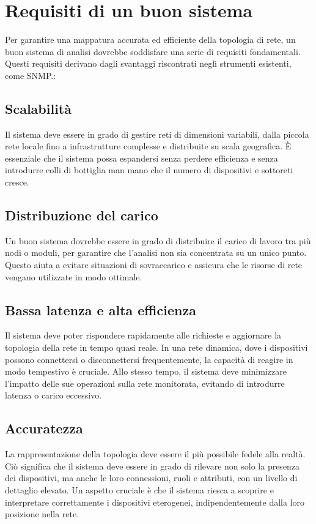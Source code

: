 \documentclass[target=bach,aauheader=,style=]{thud}
\begin{document}
\chapter{Requisiti di un buon sistema}
Per garantire una mappatura accurata ed efficiente della topologia di rete, un buon sistema di analisi dovrebbe soddisfare una serie di requisiti fondamentali. Questi requisiti derivano dagli svantaggi riscontrati negli strumenti esistenti, come SNMP.:

\section{Scalabilità}
Il sistema deve essere in grado di gestire reti di dimensioni variabili, dalla piccola rete locale fino a infrastrutture complesse e distribuite su scala geografica. È essenziale che il sistema possa espandersi senza perdere efficienza e senza introdurre colli di bottiglia man mano che il numero di dispositivi e sottoreti cresce.

\section{Distribuzione del carico}
Un buon sistema dovrebbe essere in grado di distribuire il carico di lavoro tra più nodi o moduli, per garantire che l'analisi non sia concentrata su un unico punto. Questo aiuta a evitare situazioni di sovraccarico e assicura che le risorse di rete vengano utilizzate in modo ottimale.

\section{Bassa latenza e alta efficienza}
Il sistema deve poter rispondere rapidamente alle richieste e aggiornare la topologia della rete in tempo quasi reale. In una rete dinamica, dove i dispositivi possono connettersi o disconnettersi frequentemente, la capacità di reagire in modo tempestivo è cruciale. Allo stesso tempo, il sistema deve minimizzare l'impatto delle sue operazioni sulla rete monitorata, evitando di introdurre latenza o carico eccessivo.

\section{Accuratezza}
La rappresentazione della topologia deve essere il più possibile fedele alla realtà. Ciò significa che il sistema deve essere in grado di rilevare non solo la presenza dei dispositivi, ma anche le loro connessioni, ruoli e attributi, con un livello di dettaglio elevato. Un aspetto cruciale è che il sistema riesca a scoprire e interpretare correttamente i dispositivi eterogenei, indipendentemente dalla loro posizione nella rete.
\end{document}
